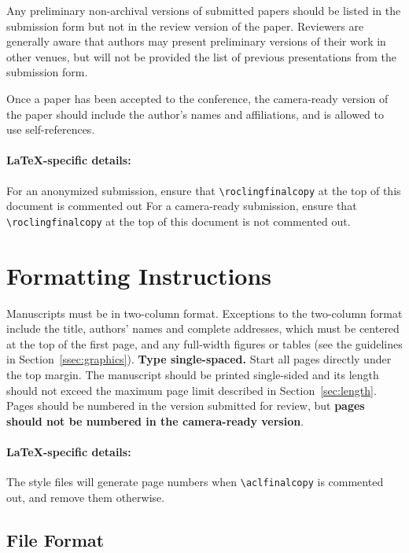 \documentclass[11pt,a4paper]{article}
\begin{document}
Any preliminary non-archival versions of submitted papers should be listed in the submission form but not in the review version of the paper.
Reviewers are generally aware that authors may present preliminary versions of their work in other venues, but will not be provided the list of previous presentations from the submission form.

Once a paper has been accepted to the conference, the camera-ready version of the paper should include the author's names and affiliations, and is allowed to use self-references.

\paragraph{\LaTeX-specific details:}
For an anonymized submission, ensure that {\small\verb|\roclingfinalcopy|} at the top of this document is commented out
For a camera-ready submission, ensure that {\small\verb|\roclingfinalcopy|} at the top of this document is not commented out.


\section{Formatting Instructions}

Manuscripts must be in two-column format.
Exceptions to the two-column format include the title, authors' names and complete addresses, which must be centered at the top of the first page, and any full-width figures or tables (see the guidelines in Section~\ref{ssec:graphics}).
\textbf{Type single-spaced.}
Start all pages directly under the top margin.
The manuscript should be printed single-sided and its length should not exceed the maximum page limit described in Section~\ref{sec:length}.
Pages should be numbered in the version submitted for review, but \textbf{pages should not be numbered in the camera-ready version}.

\paragraph{\LaTeX-specific details:}
The style files will generate page numbers when {\small\verb|\aclfinalcopy|} is commented out, and remove them otherwise.


\subsection{File Format}
\label{sect:pdf}
\end{document}
